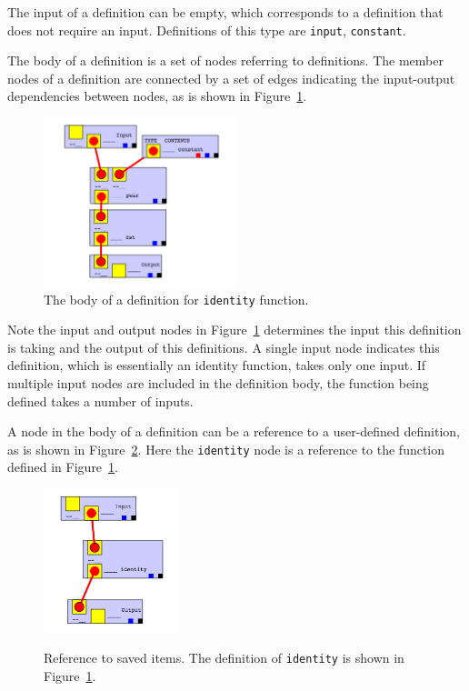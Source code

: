\documentclass[12pt,UTF8,a4]{article}
\newcommand{\code}[1]{\texttt{#1}}
\begin{document}
The input of a definition can be empty, which corresponds to a definition that does not require an input. Definitions of this type are \code{input}, \code{constant}.

The body of a definition is a set of nodes referring to definitions. The member nodes of a definition are connected by a set of edges indicating the input-output dependencies between nodes, as is shown in Figure~\ref{fig:defbody}.

\begin{figure}[h]
\center
\includegraphics[width=0.5\textwidth]{./images/defbody}
\caption{The body of a definition for \code{identity} function.}\label{fig:defbody}
\end{figure}

Note the input and output nodes in Figure~\ref{fig:defbody} determines the input this definition is taking and the output of this definitions. A single input node indicates this definition, which is essentially an identity function, takes only one input. If multiple input nodes are included in the definition body, the function being defined takes a number of inputs.

A node in the body of a definition can be a reference to a user-defined definition, as is shown in Figure~\ref{fig:ref}. Here the \code{identity} node is a reference to the function defined in Figure~\ref{fig:defbody}.
\begin{figure}[h]
\center
\includegraphics[width=0.35\textwidth]{./images/ref} \\
\caption{Reference to saved items. The definition of \code{identity} is shown in Figure~\ref{fig:defbody}.}\label{fig:ref}
\end{figure}
\end{document}
